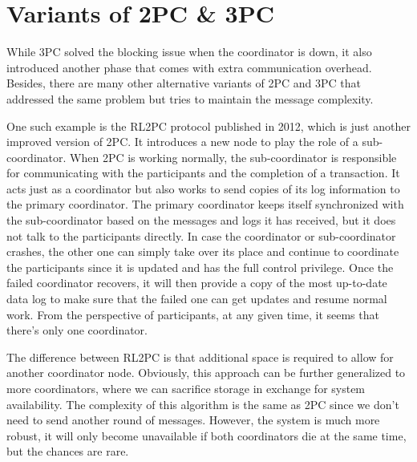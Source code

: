 \documentclass[11pt]{article}
\begin{document}
  \section{Variants of 2PC \& 3PC}
    While \small{3PC} \normalsize solved the blocking issue when the coordinator is down, it also introduced another phase that comes with extra communication overhead. Besides, there are many other alternative variants of \small{2PC} \normalsize and \small{3PC} \normalsize that addressed the same problem but tries to maintain the message complexity.

    One such example is the \small{RL2PC} \normalsize protocol published in 2012\autocite{i2pc}, which is just another improved version of \small{2PC}\normalsize. It introduces a new node to play the role of a sub-coordinator. When \small{2PC} \normalsize is working normally, the sub-coordinator is responsible for communicating with the participants and the completion of a transaction. It acts just as a coordinator but also works to send copies of its log information to the primary coordinator. The primary coordinator keeps itself synchronized with the sub-coordinator based on the messages and logs it has received, but it does not talk to the participants directly. In case the coordinator or sub-coordinator crashes, the other one can simply take over its place and continue to coordinate the participants since it is updated and has the full control privilege. Once the failed coordinator recovers, it will then provide a copy of the most up-to-date data log to make sure that the failed one can get updates and resume normal work. From the perspective of participants, at any given time, it seems that there's only one coordinator.

    The difference between \small{RL2PC} \normalsize is that additional space is required to allow for another coordinator node. Obviously, this approach can be further generalized to more coordinators, where we can sacrifice storage in exchange for system availability. The complexity of this algorithm is the same as \small{2PC} \normalsize since we don't need to send another round of messages. However, the system is much more robust, it will only become unavailable if both coordinators die at the same time, but the chances are rare.
\end{document}
